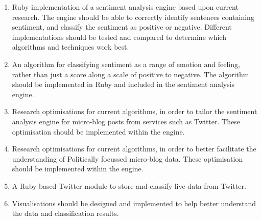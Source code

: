\begin{enumerate}

\item Ruby implementation of a sentiment analysis engine based upon current research. The engine should be able to correctly identify sentences containing sentiment, and classify the sentiment as positive or negative. Different implementations should be tested and compared to determine which algorithms and techniques work best.

\item An algorithm for classifying sentiment as a range of emotion and feeling, rather than just a score along a scale of positive to negative. The algorithm should be implemented in Ruby and included in the sentiment analysis engine.

\item Research optimisations for current algorithms, in order to tailor the sentiment analysis engine for micro-blog posts from services such as Twitter. These optimisation should be implemented within the engine.

\item Research optimisations for current algorithms, in order to better facilitate the understanding of Politically focussed micro-blog data. These optimisation should be implemented within the engine.

\item A Ruby based Twitter module to store and classify live data from Twitter. 

\item Visualisations should be designed and implemented to help better understand the data and classification results.

\end{enumerate}